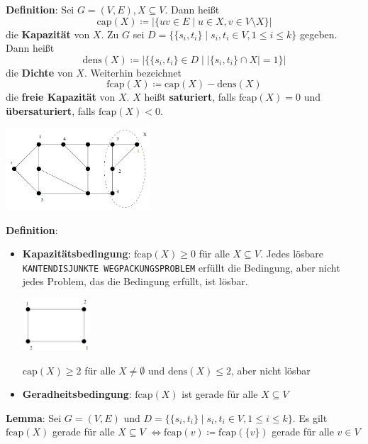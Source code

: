 \textbf{Definition}: Sei $G=(V,E), X\subseteq V$. Dann heißt
$$\text{cap}(X)\coloneqq |\{uv\in E\mid u\in X, v\in V\setminus X\}|$$
die \textbf{Kapazität} von $X$. Zu $G$ sei $D=\{\{s_i,t_i\}\mid s_i,t_i\in V,1\leq i\leq k\}$ gegeben. Dann heißt
$$\text{dens}(X)\coloneqq|\{\{s_i,t_i\}\in D\mid |\{s_i,t_i\}\cap X|=1\}|$$
die \textbf{Dichte} von $X$. Weiterhin bezeichnet
$$\text{fcap}(X)\coloneqq \text{cap}(X)-\text{dens}(X)$$
die \textbf{freie Kapazität} von $X$. $X$ heißt \textbf{saturiert}, falls $\text{fcap}(X)=0$ und \textbf{übersaturiert}, falls $\text{fcap}(X)<0$.
\begin{center}
	\includegraphics[width=0.4\textwidth]{images/s1.png}
\end{center}
\pagebreak
\textbf{Definition}:
\begin{itemize}
	\item \textbf{Kapazitätsbedingung}: $\text{fcap}(X)\geq 0$ für alle $X\subseteq V$. Jedes lösbare \texttt{KANTENDISJUNKTE WEGPACKUNGSPROBLEM} erfüllt die Bedingung, aber nicht jedes Problem, das die Bedingung erfüllt, ist lösbar.
	\begin{center}
		\includegraphics[width=0.2\textwidth]{images/s2.png}
	\end{center}
	$\text{cap}(X)\geq 2$ für alle $X\neq \emptyset$ und $\text{dens}(X)\leq 2$, aber nicht lösbar
	\item \textbf{Geradheitsbedingung}: $\text{fcap}(X)$ ist gerade für alle $X\subseteq V$
\end{itemize}
\bigskip
\textbf{Lemma}: Sei $G=(V,E)$ und $D=\{\{s_i,t_i\}\mid s_i,t_i\in V,1\leq i\leq k\}$. Es gilt $\text{fcap}(X)$ gerade für alle $X\subseteq V$ $\iff \text{fcap}(v)\coloneqq\text{fcap}(\{v\})$ gerade für alle $v\in V$

